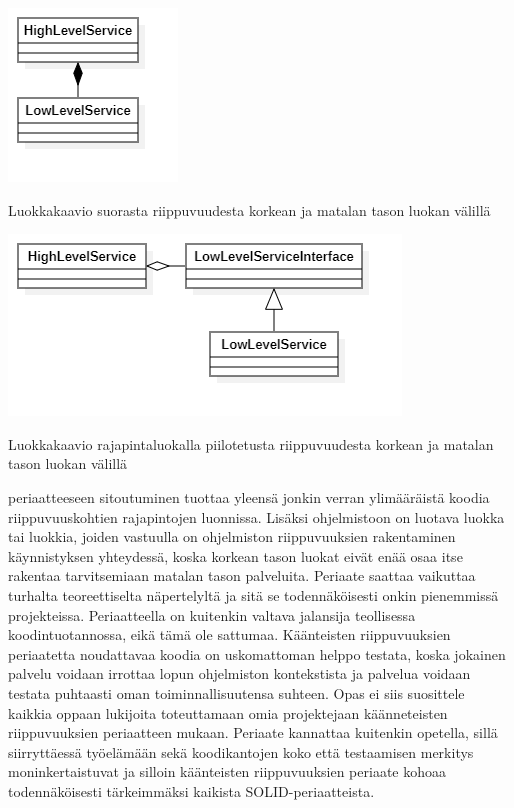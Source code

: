 \documentclass{tufte-book}
\begin{document}
\begin{listing}
    \includegraphics{NoDIPExample}
    \caption{Luokkakaavio suorasta riippuvuudesta korkean ja matalan tason luokan välillä}
    \label{luokkakaavioluokka}
\end{listing}

\begin{listing}
    \includegraphics{DIPExample}
    \caption{Luokkakaavio rajapintaluokalla piilotetusta riippuvuudesta korkean ja matalan tason luokan välillä}
    \label{luokkakaavioluokka}
\end{listing}

 periaatteeseen sitoutuminen tuottaa yleensä jonkin verran
ylimääräistä koodia riippuvuuskohtien rajapintojen luonnissa. Lisäksi ohjelmistoon on luotava
luokka tai luokkia, joiden vastuulla on ohjelmiston riippuvuuksien rakentaminen käynnistyksen
yhteydessä, koska korkean tason luokat eivät enää osaa itse rakentaa tarvitsemiaan matalan tason
palveluita. Periaate saattaa vaikuttaa turhalta teoreettiselta näpertelyltä ja sitä se
todennäköisesti onkin pienemmissä projekteissa. Periaatteella on kuitenkin valtava jalansija
teollisessa koodintuotannossa, eikä tämä ole sattumaa. Käänteisten riippuvuuksien periaatetta
noudattavaa koodia on uskomattoman helppo testata, koska jokainen palvelu voidaan irrottaa lopun
ohjelmiston kontekstista ja palvelua voidaan testata puhtaasti oman toiminnallisuutensa suhteen.
Opas ei siis suosittele kaikkia oppaan lukijoita toteuttamaan omia projektejaan käänneteisten
riippuvuuksien periaatteen mukaan. Periaate kannattaa kuitenkin opetella, sillä siirryttäessä
työelämään sekä koodikantojen koko että testaamisen merkitys moninkertaistuvat ja silloin
käänteisten riippuvuuksien periaate kohoaa todennäköisesti tärkeimmäksi kaikista 
SOLID-periaatteista.
\end{document}
